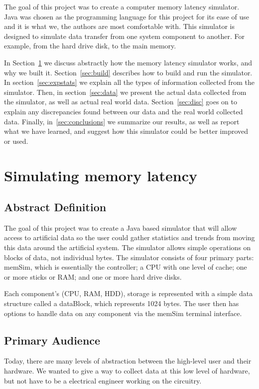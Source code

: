 \documentclass[12pt]{article}
\begin{document}
The goal of this project was to create a computer memory latency simulator. 
Java was chosen as the programming language for this project for its ease of use and
it is what we, the authors are most comfortable with.
This simulator is designed to simulate data transfer from one system component 
to another. For example, from the hard drive disk, to the main memory. 

In Section~\ref{sec:memlate} we discuss abstractly how the memory latency 
simulator works, and why we built it. Section~\ref{sec:build} describes
how to build and run the simulator. In section~\ref{sec:expstats} we explain
all the types of information collected from the simulator. Then, in section~\ref{sec:data}
we present the actual data collected from the simulator, as well as actual 
real world data. Section~\ref{sec:disc} goes on to explain any discrepancies 
found between our data and the real world collected data. Finally, in~\ref{sec:conclusions}
we summarize our results, as well as report what
we have learned, and suggest how this simulator could be better
improved or used. 

\section{Simulating memory latency}
\label{sec:memlate}

\subsection{Abstract Definition}
The goal of this project was to create a Java based simulator that will allow
access to artificial data so the user could gather statistics and trends
from moving this data around the artificial system. The simulator allows simple operations
on blocks of data, not individual bytes. The simulator consists of four
primary parts: memSim, which is essentially the controller; a CPU with one level of cache;
one or more sticks or RAM; and one or more hard drive disks.

Each component's (CPU, RAM, HDD), storage is represented with a simple data structure called
a dataBlock, which represents 1024 bytes. The user then has options to handle data on any
component via the memSim terminal interface.

\subsection{Primary Audience}
Today, there are many levels of abstraction between the high-level user and their hardware.
We wanted to give a way to collect data at this low level of hardware, but not have
to be a electrical engineer working on the circuitry.
\end{document}
